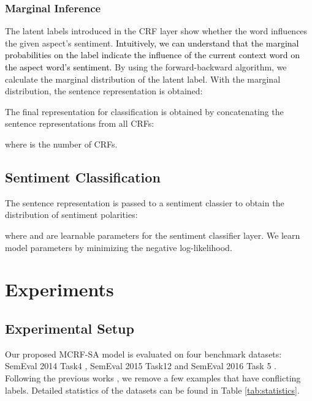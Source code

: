 \documentclass[11pt,a4paper]{article}
\begin{document}
\subsubsection{Marginal Inference}
The latent labels introduced in the CRF layer show whether the word influences the given aspect's sentiment.  \textcolor{black}{Intuitively, we can understand that the marginal probabilities on the  label indicate the influence of the current context word on the aspect word's sentiment. }
 By using the forward-backward algorithm, we calculate the marginal distribution of the latent label. With the marginal distribution, the sentence representation  is obtained:

 The final  representation for classification is obtained by concatenating the sentence representations from all CRFs:

where  is the number of CRFs.

\subsection{Sentiment Classification}


The sentence representation  is passed to a sentiment classier to obtain the distribution of sentiment polarities:

where  and  are learnable parameters for the sentiment classifier layer. We learn model parameters by minimizing the negative log-likelihood.





\section{Experiments}
\subsection{Experimental Setup}
Our proposed MCRF-SA model  is evaluated on four benchmark datasets: SemEval 2014 Task4 \cite{pontiki-EtAl:2014:SemEval}, SemEval 2015 Task12 \cite{pontiki-etal-2015-semeval} and SemEval 2016 Task 5 \cite{pontiki-etal-2016-semeval}. 
Following the previous works \cite{Tang2016AspectLS, chen-EtAl:2017:EMNLP20171, bailin-lu:2018:AAAI2018, he-etal-2018-effective}, we remove a few examples that have conflicting labels. Detailed statistics of the datasets can be found in Table \ref{tab:statistics}. 
\end{document}
